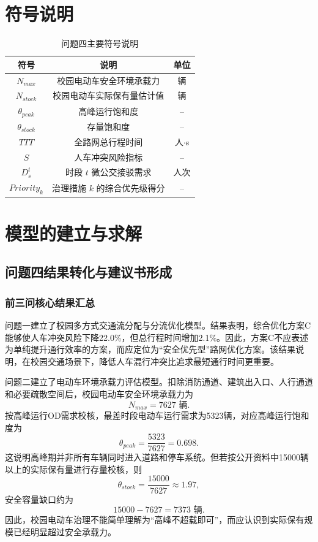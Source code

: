 \documentclass[UTF8,zihao=-4,a4paper]{ctexart}
\begin{document}
\section{符号说明}

\begin{table}[H]
\centering
\caption{问题四主要符号说明}
\label{tab:symbols_q4}
\begin{tabular}{ccc}
\toprule
\textbf{符号} & \textbf{说明} & \textbf{单位} \\
\midrule
$N_{max}$ & 校园电动车安全环境承载力 & 辆 \\
$N_{stock}$ & 校园电动车实际保有量估计值 & 辆 \\
$\theta_{peak}$ & 高峰运行饱和度 & -- \\
$\theta_{stock}$ & 存量饱和度 & -- \\
$TTT$ & 全路网总行程时间 & 人$\cdot$s \\
$S$ & 人车冲突风险指标 & -- \\
$D_s^t$ & 时段 $t$ 微公交接驳需求 & 人次 \\
$Priority_k$ & 治理措施 $k$ 的综合优先级得分 & -- \\
\bottomrule
\end{tabular}
\end{table}

\section{模型的建立与求解}

\subsection{问题四结果转化与建议书形成}

\subsubsection{前三问核心结果汇总}

问题一建立了校园多方式交通流分配与分流优化模型。结果表明，综合优化方案C能够使人车冲突风险下降22.0\%，但总行程时间增加2.1\%。因此，方案C不应表述为单纯提升通行效率的方案，而应定位为“安全优先型”路网优化方案。该结果说明，在校园交通场景下，降低人车混行冲突比追求最短通行时间更重要。

问题二建立了电动车环境承载力评估模型。扣除消防通道、建筑出入口、人行通道和必要疏散空间后，校园电动车安全环境承载力为
\begin{equation}
N_{max}=7627\text{ 辆}.
\end{equation}
按高峰运行OD需求校核，最差时段电动车运行需求为5323辆，对应高峰运行饱和度为
\begin{equation}
\theta_{peak}=\frac{5323}{7627}=0.698.
\end{equation}
这说明高峰期并非所有车辆同时进入道路和停车系统。但若按公开资料中15000辆以上的实际保有量进行存量校核，则
\begin{equation}
\theta_{stock}=\frac{15000}{7627}\approx1.97,
\end{equation}
安全容量缺口约为
\begin{equation}
15000-7627=7373\text{ 辆}.
\end{equation}
因此，校园电动车治理不能简单理解为“高峰不超载即可”，而应认识到实际保有规模已经明显超过安全承载力。
\end{document}
